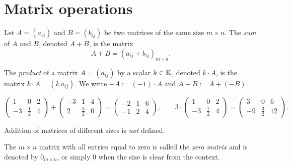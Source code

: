 \section{Matrix operations}

\begin{definition}[Addition]
Let $A=(a_{ij})$ and $B=(b_{ij})$ be two matrices of the same size $m\times n$. The \emph{sum} of $A$ and $B$,
denoted $A+B$, is the matrix
\[
A+B = (a_{ij}+b_{ij})_{m\times n}.
\]
\end{definition}

\begin{definition}
The \emph{product} of a matrix $A=(a_{ij})$ by a scalar $k\in \mathbb{K}$, denoted $k\cdot A$, is the matrix
$k\cdot A = (k\,a_{ij})$. We write $-A := (-1)\cdot A$ and $A-B := A+(-B)$.
\end{definition}

\begin{example}
\[
\left( \begin{array}{ccc} 1 & 0 & 2 \\ -3 & \tfrac{1}{2} & 4 \end{array} \right)
+
\left( \begin{array}{ccc} -3 & 1 & 4 \\ 2 & \tfrac{3}{2} & 0 \end{array} \right) =
\left( \begin{array}{ccc} -2 & 1 & 6 \\ -1 & 2 & 4 \end{array} \right),
\qquad
3\cdot \left( \begin{array}{ccc} 1 & 0 & 2 \\ -3 & \tfrac{1}{2} & 4 \end{array} \right)
=
\left( \begin{array}{ccc} 3 & 0 & 6 \\ -9 & \tfrac{3}{2} & 12 \end{array} \right).
\]
\end{example}

\begin{warning}
Addition of matrices of different sizes is \emph{not} defined.
\end{warning}

\begin{definition}
The $m\times n$ matrix with all entries equal to zero is called the \emph{zero matrix} and is denoted by
$0_{m\times n}$, or simply $0$ when the size is clear from the context.
\end{definition}

